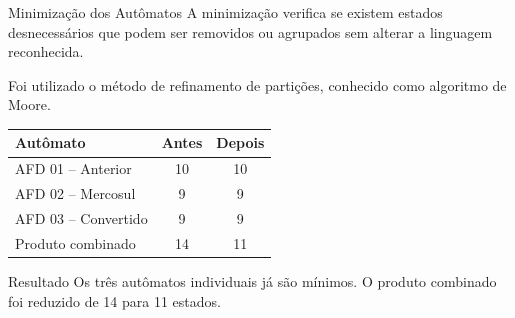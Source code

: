 \documentclass[aspectratio=169,12pt]{beamer}
\begin{document}
\begin{frame}{Minimização dos Autômatos}
    \small
    A minimização verifica se existem estados desnecessários
    que podem ser removidos ou agrupados sem alterar
    a linguagem reconhecida.

    \vspace{0.3cm}

    Foi utilizado o método de refinamento de partições,
    conhecido como algoritmo de Moore.

    \begin{center}
    \begin{tabular}{lcc}
        \toprule
        \textbf{Autômato} & \textbf{Antes} & \textbf{Depois} \\
        \midrule
        AFD 01 -- Anterior & 10 & 10 \\
        AFD 02 -- Mercosul & 9 & 9 \\
        AFD 03 -- Convertido & 9 & 9 \\
        Produto combinado & 14 & 11 \\
        \bottomrule
    \end{tabular}
    \end{center}

    \vspace{0.3cm}

    \begin{block}{Resultado}
        \footnotesize
        Os três autômatos individuais já são mínimos.
        O produto combinado foi reduzido de 14 para 11 estados.
    \end{block}

\end{frame}

\end{document}
